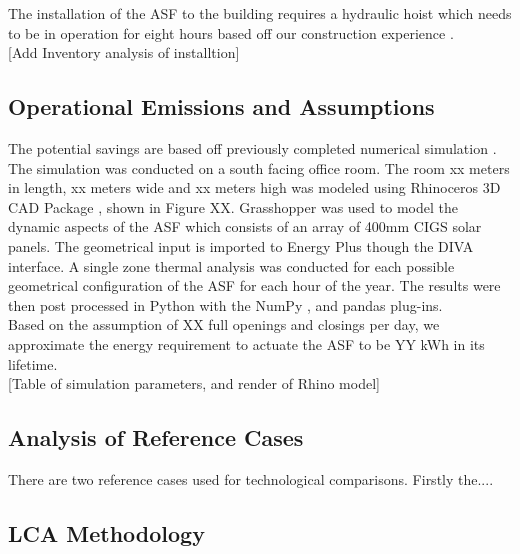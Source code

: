The installation of the ASF to the building requires a hydraulic hoist which needs to be in operation for eight hours based off our construction experience \cite{jayathissa2015abs}. \\

[Add Inventory analysis of installtion]


\subsection{Operational Emissions and Assumptions}

The potential savings are based off previously completed numerical simulation \cite{jayathissa2015abs}. The simulation was conducted on a south facing office room. The room xx meters in length, xx meters wide and xx meters high was modeled using Rhinoceros 3D CAD Package \cite{Rhino}, shown in Figure XX. Grasshopper \cite{grasshopper} was used to model the dynamic aspects of the ASF which consists of an array of 400mm CIGS solar panels. The geometrical input is imported to Energy Plus \cite{energyplus} though the DIVA \cite{DIVA} interface. A single zone thermal analysis was conducted for each possible geometrical configuration of the ASF for each hour of the year. The results were then post processed in Python \cite{python} with the NumPy \cite{numpy}, and pandas \cite{pandas} plug-ins. \\

Based on the assumption of XX full openings and closings per day, we approximate the energy requirement to actuate the ASF to be YY kWh in its lifetime.\\

[Table of simulation parameters, and render of Rhino model]


\subsection{Analysis of Reference Cases}

There are two reference cases used for technological comparisons. Firstly the....


\subsection{LCA Methodology}



